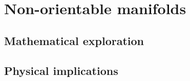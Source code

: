 \chapter{Non-orientable manifolds}

\section{Mathematical exploration}

\section{Physical implications}